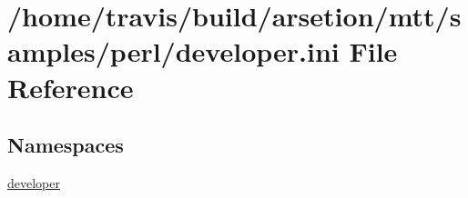\hypertarget{developer_8ini}{\section{/home/travis/build/arsetion/mtt/samples/perl/developer.ini File Reference}
\label{developer_8ini}
}
\subsection*{Namespaces}
\begin{DoxyCompactItemize}
\item 
\hyperlink{namespacedeveloper}{developer}
\end{DoxyCompactItemize}
